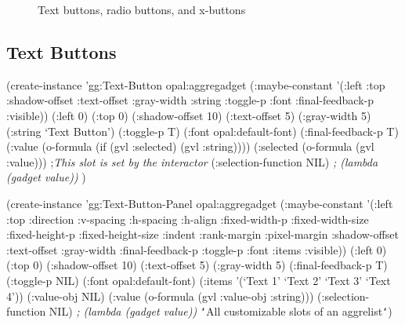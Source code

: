 \begin{figure}
\begin{center}
\end{center}
\caption{Text buttons, radio buttons, and x-buttons}
\end{figure}

\begin{group}
\subsection{Text Buttons}
\label{text-buttons}
\begin{programexample}
(create-instance 'gg:Text-Button opal:aggregadget
   (:maybe-constant '(:left :top :shadow-offset :text-offset :gray-width
		      :string :toggle-p :font :final-feedback-p :visible))
   (:left 0)
   (:top 0)
   (:shadow-offset 10)
   (:text-offset 5)
   (:gray-width 5)
   (:string `Text Button')
   (:toggle-p T)
   (:font opal:default-font)
   (:final-feedback-p T)
   (:value (o-formula (if (gvl :selected) (gvl :string))))
   (:selected (o-formula (gvl :value)))   ;{\it  This slot is set by the interactor}
   (:selection-function NIL)   {\it ; (lambda (gadget value))}
   )
\end{programexample}
\end{group}
\vspace{1 line}

\begin{group}
\begin{programexample}
(create-instance 'gg:Text-Button-Panel opal:aggregadget
   (:maybe-constant '(:left :top :direction :v-spacing :h-spacing :h-align
		      :fixed-width-p :fixed-width-size :fixed-height-p
		      :fixed-height-size :indent :rank-margin :pixel-margin
		      :shadow-offset :text-offset :gray-width :final-feedback-p
		      :toggle-p :font :items :visible))
   (:left 0)
   (:top 0)
   (:shadow-offset 10)
   (:text-offset 5)
   (:gray-width 5)
   (:final-feedback-p T)
   (:toggle-p NIL)
   (:font opal:default-font)
   (:items '(`Text 1' `Text 2' `Text 3' `Text 4'))
   (:value-obj NIL)
   (:value (o-formula (gvl :value-obj :string)))
   (:selection-function NIL)   {\it ; (lambda (gadget value))}
   {\tt\char`\<}All customizable slots of an aggrelist{\tt\char`\>})
\end{programexample}
\end{group}


